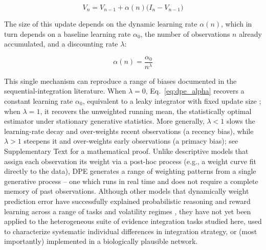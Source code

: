 \documentclass[12pt]{article}
\begin{document}
\begin{equation}
    \label{eq:dpe_update}
    V_n = V_{n-1} + \alpha(n) \bigl(I_n - V_{n-1}\bigr)
\end{equation}

\noindent The size of this update depends on the dynamic learning rate $\alpha(n)$, which in turn depends on a baseline learning rate $\alpha_0$, the number of observations $n$ already accumulated, and a discounting rate $\lambda$:

\begin{equation}
    \label{eq:dpe_alpha}
    \alpha(n) = \frac{\alpha_0}{n^\lambda}
\end{equation}

This single mechanism can reproduce a range of biases documented in the sequential-integration literature. When $\lambda=0$, Eq.~\ref{eq:dpe_alpha} recovers a constant learning rate $\alpha_0$, equivalent to a leaky integrator with fixed update size \cite{usher2001time, glaze2015normative}; when $\lambda=1$, it recovers the unweighted running mean, the statistically optimal estimator under stationary generative statistics. More generally, $\lambda<1$ slows the learning-rate decay and over-weights recent observations (a recency bias), while $\lambda>1$ steepens it and over-weights early observations (a primacy bias); see Supplementary Text for a mathematical proof. Unlike descriptive models that assign each observation its weight via a post-hoc process (e.g., a weight curve fit directly to the data), DPE generates a range of weighting patterns from a single generative process -- one which runs in real time and does not require a complete memory of past observations. Although other models that dynamically weight prediction error have successfully explained probabilistic reasoning and reward learning across a range of tasks and volatility regimes \cite{behrens2007learning, piray2021model, nassar2010approximately, yu2008sequential, camerer1999experience}, they have not yet been applied to the heterogeneous suite of evidence integration tasks studied here, used to characterize systematic individual differences in integration strategy, or (most importantly) implemented in a biologically plausible network.
\end{document}
